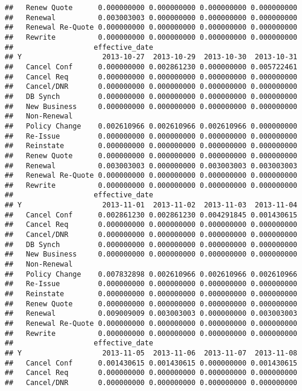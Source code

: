 \documentclass[]{article}
\begin{document}
\begin{verbatim}
##   Renew Quote      0.000000000 0.000000000 0.000000000 0.000000000
##   Renewal          0.003003003 0.000000000 0.000000000 0.000000000
##   Renewal Re-Quote 0.000000000 0.000000000 0.000000000 0.000000000
##   Rewrite          0.000000000 0.000000000 0.000000000 0.000000000
##                   effective_date
## Y                   2013-10-27  2013-10-29  2013-10-30  2013-10-31
##   Cancel Conf      0.000000000 0.002861230 0.000000000 0.005722461
##   Cancel Req       0.000000000 0.000000000 0.000000000 0.000000000
##   Cancel/DNR       0.000000000 0.000000000 0.000000000 0.000000000
##   DB Synch         0.000000000 0.000000000 0.000000000 0.000000000
##   New Business     0.000000000 0.000000000 0.000000000 0.000000000
##   Non-Renewal                                                     
##   Policy Change    0.002610966 0.002610966 0.002610966 0.000000000
##   Re-Issue         0.000000000 0.000000000 0.000000000 0.000000000
##   Reinstate        0.000000000 0.000000000 0.000000000 0.000000000
##   Renew Quote      0.000000000 0.000000000 0.000000000 0.000000000
##   Renewal          0.003003003 0.000000000 0.003003003 0.003003003
##   Renewal Re-Quote 0.000000000 0.000000000 0.000000000 0.000000000
##   Rewrite          0.000000000 0.000000000 0.000000000 0.000000000
##                   effective_date
## Y                   2013-11-01  2013-11-02  2013-11-03  2013-11-04
##   Cancel Conf      0.002861230 0.002861230 0.004291845 0.001430615
##   Cancel Req       0.000000000 0.000000000 0.000000000 0.000000000
##   Cancel/DNR       0.000000000 0.000000000 0.000000000 0.000000000
##   DB Synch         0.000000000 0.000000000 0.000000000 0.000000000
##   New Business     0.000000000 0.000000000 0.000000000 0.000000000
##   Non-Renewal                                                     
##   Policy Change    0.007832898 0.002610966 0.002610966 0.002610966
##   Re-Issue         0.000000000 0.000000000 0.000000000 0.000000000
##   Reinstate        0.000000000 0.000000000 0.000000000 0.000000000
##   Renew Quote      0.000000000 0.000000000 0.000000000 0.000000000
##   Renewal          0.009009009 0.003003003 0.000000000 0.003003003
##   Renewal Re-Quote 0.000000000 0.000000000 0.000000000 0.000000000
##   Rewrite          0.000000000 0.000000000 0.000000000 0.000000000
##                   effective_date
## Y                   2013-11-05  2013-11-06  2013-11-07  2013-11-08
##   Cancel Conf      0.001430615 0.001430615 0.000000000 0.001430615
##   Cancel Req       0.000000000 0.000000000 0.000000000 0.000000000
##   Cancel/DNR       0.000000000 0.000000000 0.000000000 0.000000000

\end{verbatim}
\end{document}
